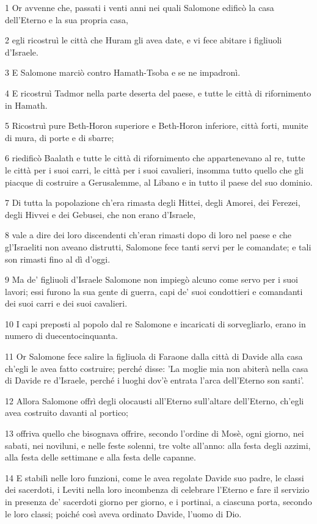 \par 1 Or avvenne che, passati i venti anni nei quali Salomone edificò la casa dell'Eterno e la sua propria casa,
\par 2 egli ricostruì le città che Huram gli avea date, e vi fece abitare i figliuoli d'Israele.
\par 3 E Salomone marciò contro Hamath-Tsoba e se ne impadronì.
\par 4 E ricostruì Tadmor nella parte deserta del paese, e tutte le città di rifornimento in Hamath.
\par 5 Ricostruì pure Beth-Horon superiore e Beth-Horon inferiore, città forti, munite di mura, di porte e di sbarre;
\par 6 riedificò Baalath e tutte le città di rifornimento che appartenevano al re, tutte le città per i suoi carri, le città per i suoi cavalieri, insomma tutto quello che gli piacque di costruire a Gerusalemme, al Libano e in tutto il paese del suo dominio.
\par 7 Di tutta la popolazione ch'era rimasta degli Hittei, degli Amorei, dei Ferezei, degli Hivvei e dei Gebusei, che non erano d'Israele,
\par 8 vale a dire dei loro discendenti ch'eran rimasti dopo di loro nel paese e che gl'Israeliti non aveano distrutti, Salomone fece tanti servi per le comandate; e tali son rimasti fino al dì d'oggi.
\par 9 Ma de' figliuoli d'Israele Salomone non impiegò alcuno come servo per i suoi lavori; essi furono la sua gente di guerra, capi de' suoi condottieri e comandanti dei suoi carri e dei suoi cavalieri.
\par 10 I capi preposti al popolo dal re Salomone e incaricati di sorvegliarlo, erano in numero di duecentocinquanta.
\par 11 Or Salomone fece salire la figliuola di Faraone dalla città di Davide alla casa ch'egli le avea fatto costruire; perché disse: 'La moglie mia non abiterà nella casa di Davide re d'Israele, perché i luoghi dov'è entrata l'arca dell'Eterno son santi'.
\par 12 Allora Salomone offrì degli olocausti all'Eterno sull'altare dell'Eterno, ch'egli avea costruito davanti al portico;
\par 13 offriva quello che bisognava offrire, secondo l'ordine di Mosè, ogni giorno, nei sabati, nei noviluni, e nelle feste solenni, tre volte all'anno: alla festa degli azzimi, alla festa delle settimane e alla festa delle capanne.
\par 14 E stabilì nelle loro funzioni, come le avea regolate Davide suo padre, le classi dei sacerdoti, i Leviti nella loro incombenza di celebrare l'Eterno e fare il servizio in presenza de' sacerdoti giorno per giorno, e i portinai, a ciascuna porta, secondo le loro classi; poiché così aveva ordinato Davide, l'uomo di Dio.
